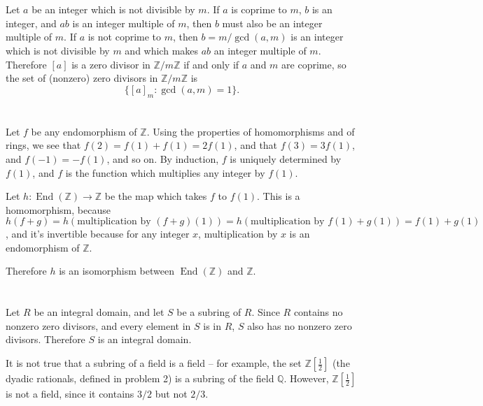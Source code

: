 \documentclass[12pt]{article}
\begin{document}
\section{}
\noindent{}\bigskip
\par
Let $a$ be an integer which is not divisible by $m$. If $a$ is coprime to $m$, $b$ is an integer, and $ab$ is an integer multiple of $m$, then $b$ must also be an integer multiple of $m$. If $a$ is not coprime to $m$, then $b=m/\operatorname{gcd}(a,m)$ is an integer which is not divisible by $m$ and which makes $ab$ an integer multiple of $m$. Therefore $[a]$ is a zero divisor in $ \mathbb{Z}/m\mathbb{Z}$ if and only if $a$ and $m$ are coprime, so the set of (nonzero) zero divisors in $ \mathbb{Z}/m\mathbb{Z}$ is
\[ \{ [a]_m : \operatorname{gcd}(a,m)=1 \}. \]

\section{}
\noindent{}\bigskip
\par
Let $f$ be any endomorphism of $ \mathbb{Z}$. Using the properties of homomorphisms and of rings, we see that $f(2)=f(1)+f(1)=2f(1)$, and that $f(3)=3f(1)$, and $f(-1)=-f(1)$, and so on. By induction, $f$ is uniquely determined by $f(1)$, and $f$ is the function which multiplies any integer by $f(1)$.
\par
Let $h: \operatorname{End}( \mathbb{Z} ) \rightarrow \mathbb{Z}$ be the map which takes $f$ to $f(1)$. This is a homomorphism, because $h(f+g)=h(\text{multiplication by $(f+g)(1)$}) = h(\text{multiplication by $f(1)+g(1)$}) = f(1)+g(1)$, and it's invertible because for any integer $x$, multiplication by $x$ is an endomorphism of $ \mathbb{Z}$.
\par
Therefore $h$ is an isomorphism between $\operatorname{End}( \mathbb{Z})$ and $ \mathbb{Z}$.

\section{}
\noindent{}\bigskip
\par
Let $R$ be an integral domain, and let $S$ be a subring of $R$. Since $R$ contains no nonzero zero divisors, and every element in $S$ is in $R$, $S$ also has no nonzero zero divisors. Therefore $S$ is an integral domain.
\par
It is not true that a subring of a field is a field -- for example, the set $ \mathbb{Z}[ \frac{1}{2} ]$ (the dyadic rationals, defined in problem 2) is a subring of the field $ \mathbb{Q}$. However, $ \mathbb{Z}[ \frac{1}{2} ]$ is not a field, since it contains $3/2$ but not $2/3$.
\end{document}
